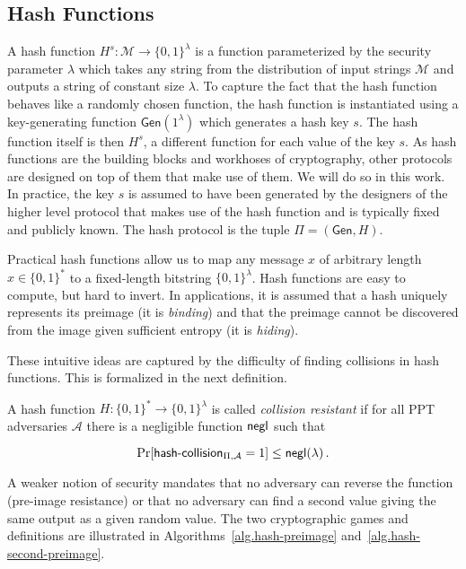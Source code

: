 \subsection{Hash Functions}
A hash function $H^s: \mathcal{M} \longrightarrow \{0, 1\}^\lambda$ is a function
parameterized by the security parameter $\lambda$ which takes any string from the distribution of input strings $\mathcal{M}$ and
outputs a string of constant size $\lambda$. To capture the fact that the hash
function behaves like a randomly chosen function, the hash
function is instantiated using a key-generating function
$\textsf{Gen}(1^\lambda)$ which generates a hash key $s$. The hash function itself is then $H^s$, a different function for each value of the key $s$. As hash functions are the building blocks and workhoses of cryptography, other protocols are designed on top of them that make use of them. We will do so in this work. In practice, the key $s$ is assumed to have been generated by the designers of the higher level protocol that makes use of the hash function and is typically fixed and publicly known. The hash protocol is the tuple $\Pi = (\textsf{Gen}, H)$.

Practical hash functions allow us to map any message $x$ of arbitrary length
$x \in \{0, 1\}^*$ to a fixed-length bitstring $\{0, 1\}^\lambda$. Hash
functions are easy to compute, but hard to invert. In applications, it is
assumed that a hash uniquely represents its preimage (it is \emph{binding}) and
that the preimage cannot be discovered from the image given sufficient entropy
(it is \emph{hiding}).

These intuitive ideas are captured by the difficulty of finding
collisions in hash functions. This is formalized in the next definition.



\begin{definition}
  A hash function $H: \{0, 1\}^* \longrightarrow \{0, 1\}^\lambda$ is called
  \emph{collision resistant} if for all PPT adversaries $\mathcal{A}$ there is a
  negligible function $\mathsf{negl}$ such that

  \[
  \Pr[\textsf{hash-collision}_{\Pi,\mathcal{A}} = 1] \leq \mathsf{negl}(\lambda)\,.
  \]
\end{definition}

A weaker notion of security mandates that no adversary can reverse the function (pre-image resistance) or that no adversary can find a second value giving the same output as a given random value. The two cryptographic games and definitions are illustrated in Algorithms~\ref{alg.hash-preimage} and~\ref{alg.hash-second-preimage}.

